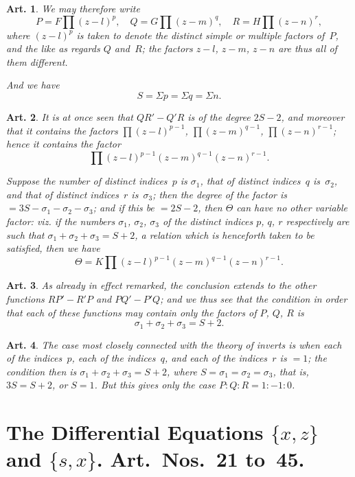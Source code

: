 \documentclass[11pt,a4paper]{article}
\theoremstyle{plain}
\newtheorem{art}{Art.}[section]
\begin{document}
\begin{art}
We may therefore write
\[
P = F \prod (z-l)^p, \quad Q = G \prod (z-m)^q, \quad R = H \prod (z-n)^r,
\]
where $(z-l)^p$ is taken to denote the distinct simple or multiple factors
of~$P$, and the like as regards $Q$ and~$R$; the factors $z-l$, $z-m$, $z-n$
are thus all of them different.

And we have
\[
S = \Sigma p = \Sigma q = \Sigma n.
\]
\end{art}

\begin{art}
It is at once seen that $QR' - Q'R$ is of the degree $2S-2$, and moreover
that it contains the factors $\prod (z-l)^{p-1}$, $\prod (z-m)^{q-1}$,
$\prod (z-n)^{r-1}$; hence it contains the factor
\[
\prod (z-l)^{p-1} (z-m)^{q-1} (z-n)^{r-1}.
\]

Suppose the number of distinct indices~$p$ is $\sigma_1$, that of distinct
indices~$q$ is~$\sigma_2$, and that of distinct indices~$r$ is~$\sigma_3$;
then the degree of the factor is $= 3S - \sigma_1 - \sigma_2 - \sigma_3$;
and if this be $= 2S - 2$, then $\Theta$ can have no other variable factor:
viz. if the numbers $\sigma_1$, $\sigma_2$, $\sigma_3$ of the distinct indices $p$, $q$, $r$
respectively are such that $\sigma_1 + \sigma_2 + \sigma_3 = S + 2$,
a relation which is henceforth taken to be satisfied, then we have
\[
\Theta = K \prod (z-l)^{p-1} (z-m)^{q-1} (z-n)^{r-1}.
\]
\end{art}

\begin{art}
As already in effect remarked, the conclusion extends to the other functions
$RP' - R'P$ and $PQ' - P'Q$; and we thus see that the condition in order
that each of these functions may contain only the factors of $P$, $Q$, $R$ is
\[
\sigma_1 + \sigma_2 + \sigma_3 = S + 2.
\]
\end{art}

\begin{art}
The case most closely connected with the theory of inverts is when each
of the indices~$p$, each of the indices~$q$, and each of the indices~$r$ is
$=1$; the condition then is $\sigma_1 + \sigma_2 + \sigma_3 = S + 2$, where
$S = \sigma_1 = \sigma_2 = \sigma_3$, that is, $3S = S + 2$, or $S = 1$.
But this gives only the case $P : Q : R = 1 : -1 : 0$.
\end{art}

\section*{The Differential Equations $\{x, z\}$ and $\{s, x\}$.
Art.~Nos.~21 to~45.}
\end{document}
